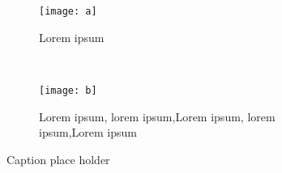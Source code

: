     \begin{figure*}[t!]
    \centering
    \begin{subfigure}[t]{0.5\textwidth}
        \centering
        \texttt{[image: a]}
        \caption{Lorem ipsum}
    \end{subfigure}%
    ~ 
    \begin{subfigure}[t]{0.5\textwidth}
        \centering
        \texttt{[image: b]}
        \caption{Lorem ipsum, lorem ipsum,Lorem ipsum, lorem ipsum,Lorem ipsum}
    \end{subfigure}
    \caption{Caption place holder}
\end{figure*}